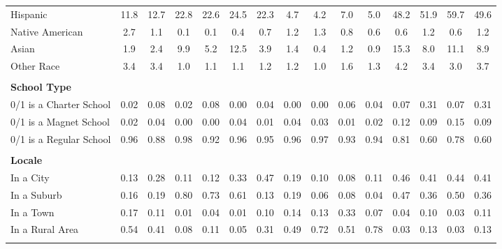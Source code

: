 \begin{tabular*}{\linewidth}{@{\extracolsep{\fill} } lcccccccccccccc}
\hspace{0.2cm}Hispanic&11.8&12.7&22.8&22.6&24.5&22.3&4.7&4.2&7.0&5.0&48.2&51.9&59.7&49.6\\%
\hspace{0.2cm}Native American&2.7&1.1&0.1&0.1&0.4&0.7&1.2&1.3&0.8&0.6&0.6&1.2&0.6&1.2\\%
\hspace{0.2cm}Asian&1.9&2.4&9.9&5.2&12.5&3.9&1.4&0.4&1.2&0.9&15.3&8.0&11.1&8.9\\%
\hspace{0.2cm}Other Race&3.4&3.4&1.0&1.1&1.1&1.2&1.2&1.0&1.6&1.3&4.2&3.4&3.0&3.7\\%
&&&&&&&&&&&&&&\\%
\multicolumn{15}{l}{\bfseries School Type}\\%
\hspace{0.2cm}0/1 is a Charter School&0.02&0.08&0.02&0.08&0.00&0.04&0.00&0.00&0.06&0.04&0.07&0.31&0.07&0.31\\%
\hspace{0.2cm}0/1 is a Magnet School&0.02&0.04&0.00&0.00&0.04&0.01&0.04&0.03&0.01&0.02&0.12&0.09&0.15&0.09\\%
\hspace{0.2cm}0/1 is a Regular School&0.96&0.88&0.98&0.92&0.96&0.95&0.96&0.97&0.93&0.94&0.81&0.60&0.78&0.60\\%
&&&&&&&&&&&&&&\\%
\multicolumn{15}{l}{\bfseries Locale}\\%
\hspace{0.2cm}In a City&0.13&0.28&0.11&0.12&0.33&0.47&0.19&0.10&0.08&0.11&0.46&0.41&0.44&0.41\\%
\hspace{0.2cm}In a Suburb&0.16&0.19&0.80&0.73&0.61&0.13&0.19&0.06&0.08&0.04&0.47&0.36&0.50&0.36\\%
\hspace{0.2cm}In a Town&0.17&0.11&0.01&0.04&0.01&0.10&0.14&0.13&0.33&0.07&0.04&0.10&0.03&0.11\\%
\hspace{0.2cm}In a Rural Area&0.54&0.41&0.08&0.11&0.05&0.31&0.49&0.72&0.51&0.78&0.03&0.13&0.03&0.13\\%
&&&&&&&&&&&&&&\\%
\hline%
\end{tabular*}